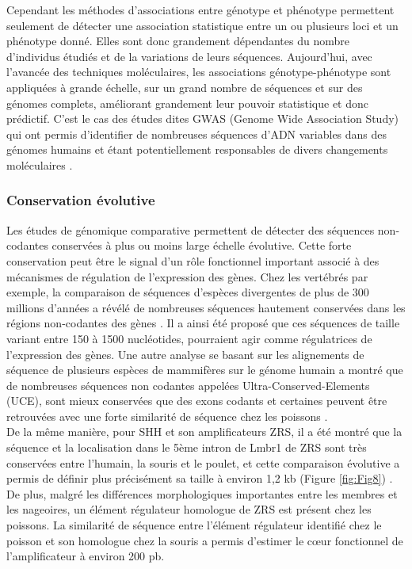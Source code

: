 Cependant les méthodes d'associations entre génotype et phénotype permettent seulement de détecter une association statistique entre un ou plusieurs loci et un phénotype donné. Elles sont donc grandement dépendantes du nombre d'individus étudiés et de la variations de leurs séquences. Aujourd’hui, avec l’avancée des techniques moléculaires, les associations génotype-phénotype sont appliquées à grande échelle, sur un grand nombre de séquences et sur des génomes complets, améliorant grandement leur pouvoir statistique et donc prédictif. C’est le cas des études dites GWAS (Genome Wide Association Study) qui ont permis d’identifier de nombreuses séquences d’ADN variables dans des génomes humains et étant potentiellement responsables de divers changements moléculaires \citep{lappalainen_evolutionary_2010, bryois_cis_2014}.

\subsubsection{Conservation évolutive}
\label{subsubsec:conserv-evol}

Les études de génomique comparative permettent de détecter des séquences non-codantes conservées à plus ou moins large échelle évolutive. Cette forte conservation peut être le signal d’un rôle fonctionnel important associé à des mécanismes de régulation de l’expression des gènes. Chez les vertébrés par exemple, la comparaison de séquences d’espèces divergentes de plus de 300 millions d’années a révélé de nombreuses séquences hautement conservées dans les régions non-codantes des gènes \citep{duret_strong_1993}. Il a ainsi été proposé que ces séquences de taille variant entre 150 à 1500 nucléotides, pourraient agir comme régulatrices de l’expression des gènes. Une autre analyse se basant sur les alignements de séquence de plusieurs espèces de mammifères sur le génome humain a montré que de nombreuses séquences non codantes appelées Ultra-Conserved-Elements (UCE), sont mieux conservées que des exons codants et certaines peuvent être retrouvées avec une forte similarité de séquence chez les poissons \citep{bejerano_ultraconserved_2004}. \\

De la même manière, pour \acrshort{SHH} et son \glspl{amplificateur} \acrshort{ZRS}, il a été montré que la séquence et la localisation dans le 5ème intron de Lmbr1 de \acrshort{ZRS} sont très conservées entre l’humain, la souris et le poulet, et cette comparaison évolutive a permis de définir plus précisément sa taille à environ 1,2 kb (Figure \ref{fig:Fig8}) \citep{lettice_long-range_2003, sagai_elimination_2005}. De plus, malgré les différences morphologiques importantes entre les membres et les nageoires, un élément régulateur homologue de \acrshort{ZRS} est présent chez les poissons. La similarité de séquence entre l’élément régulateur identifié chez le poisson et son homologue chez la souris a permis d’estimer le cœur fonctionnel de l’\gls{amplificateur} à environ 200 pb.

